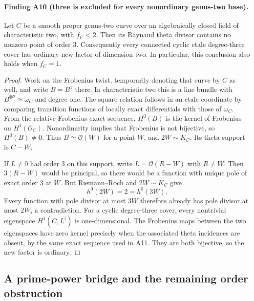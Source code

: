 \documentclass[11pt,a4paper]{article}
\begin{document}
\paragraph{Finding A10 (three is excluded for every nonordinary genus-two base).}
Let $C$ be a smooth proper genus-two curve over an algebraically
closed field of characteristic two, with $f_C<2$. Then its Raynaud
theta divisor contains no nonzero point of order $3$.
Consequently every connected cyclic etale degree-three cover has
ordinary new factor of dimension two. In particular, this conclusion
also holds when $f_C=1$.

\begin{proof}
Work on the Frobenius twist, temporarily denoting that curve by
$C$ as well, and write $B=B^1$ there. In
characteristic two this is a line bundle with $B^{\otimes2}\simeq
\omega_C$ and degree one. The square relation follows in an etale
coordinate by comparing transition functions of locally exact
differentials with those of $\omega_C$.
From the relative Frobenius exact sequence,
$H^0(B)$ is the kernel of Frobenius on $H^1(\mathcal O_C)$.
Nonordinarity implies that Frobenius is not bijective, so $H^0(B)\ne0$.
Thus $B\simeq\mathcal O(W)$ for a point $W$, and
$2W\sim K_C$. Its theta support is $C-W$.

If $L\ne0$ had order $3$ on this support, write
$L=\mathcal O(R-W)$ with $R\ne W$. Then $3(R-W)$ would be
principal, so there would be a function with unique pole of exact
order $3$ at $W$. But Riemann--Roch and $2W\sim K_C$ give
\[
 h^0(2W)=2=h^0(3W).
\]
Every function with pole divisor at most $3W$ therefore already has
pole divisor at most $2W$, a contradiction.
For a cyclic degree-three cover, every nontrivial eigenspace
$H^1(C,L^i)$ is one-dimensional. The Frobenius maps between the
two eigenspaces have zero kernel precisely when the associated
theta incidences are absent, by the same exact sequence used in
A11. They are both bijective, so the new factor is ordinary.
\end{proof}

\subsection{A prime-power bridge and the remaining order obstruction}
\label{sec:prime-power-bridge}
\end{document}
